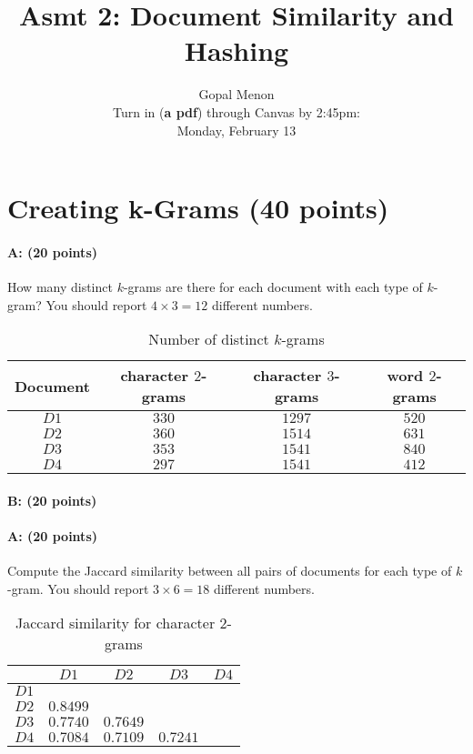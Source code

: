 \documentclass[11pt]{article}
\title{Asmt 2: Document Similarity and Hashing}
\author{Gopal Menon\\Turn in (\textbf{a pdf}) through Canvas by 2:45pm: \\
Monday, February 13}
\date{}
\begin{document}
\maketitle



\section{Creating k-Grams (40 points)}

\paragraph{A: (20 points)} 
How many distinct $k$-grams are there for each document with each type of $k$-gram? You
should report $4 \times 3 = 12$ different numbers.

    \begin{table}[!h] 
    \centering
    \caption{Number of distinct $k$-grams}
    \begin{tabular}{|c|c|c|c|}
      \hline
   Document  & character $2$-grams &  character $3$-grams & word $2$-grams  \\
      \hline      
      $D1$ &   $330$              &  $1297$  &          $520$                          \\
      \hline      
      $D2$ &    $360$             & $1514$   &           $631$                         \\
      \hline      
      $D3$ &    $353$           &  $1541$  &             $840$                       \\
      \hline      
      $D4$ &      $297$          &  $1541$  &             $412$                       \\
      \hline
    \end{tabular}
    \end{table}

\paragraph{B: (20 points)}  
\paragraph{A: (20 points)}  
Compute the Jaccard similarity between all pairs of documents for each type of $k$-gram.
You should report $3 \times 6 = 18$ different numbers.

\begin{table}[!ht]  
  \centering
  \caption{Jaccard similarity for character $2$-grams}
  \begin{tabular}{|c|c|c|c|c|}
    \cline{2-5}
    \multicolumn{1}{c|}{} & $D1$ & $D2$ & $D3$ & $D4$\\ \hline
    $D1$ &    &    &   & \\ \hline
    $D2$ & $0.8499$   &    &   & \\ \hline
    $D3$ & $0.7740$   & $0.7649$   &   & \\ \hline
    $D4$ & $0.7084$  & $0.7109$  & $0.7241$ & \\ \hline
  \end{tabular}
  \end{table}
\end{document}
